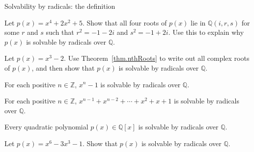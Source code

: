 \begin{section}{Solvability by radicals: the definition}
\begin{problem}
Let $p(x) = x^4+2x^2+5$. Show that all four roots of $p(x)$ lie in $\mathbb{Q}\left(i,r,s\right)$ for some $r$ and $s$ such that  $r^2 = -1-2i$ and $s^2 = -1+2i$. Use this to explain why $p(x)$ is solvable by radicals over $\mathbb{Q}$.
\end{problem}

\begin{problem}
Let $p(x) = x^3 - 2$. Use Theorem~\ref{thm.nthRoots} to write out all complex roots of $p(x)$, and then show that $p(x)$ is solvable by radicals over $\mathbb{Q}$.
\end{problem}

\begin{theorem}
For each positive $n\in \mathbb{Z}$,   $ x^n - 1$ is solvable by radicals over $\mathbb{Q}$.
\end{theorem}

\begin{theorem}\label{thm.SolvableByRadicalsNontrivialRootsOf1}
For each positive $n\in \mathbb{Z}$,   $x^{n-1} + x^{n-2} + \cdots + x^2 + x + 1$ is solvable by radicals over $\mathbb{Q}$.
\end{theorem}

\begin{theorem}
Every quadratic polynomial $p(x)\in \mathbb{Q}[x]$ is solvable by radicals over $\mathbb{Q}$.
\end{theorem}

\begin{problem}\label{prob.SolvableByRadicalsHard}
Let $p(x) = x^6 - 3x^3 - 1$. Show that $p(x)$ is solvable by radicals over $\mathbb{Q}$.
\end{problem}
\end{section}








